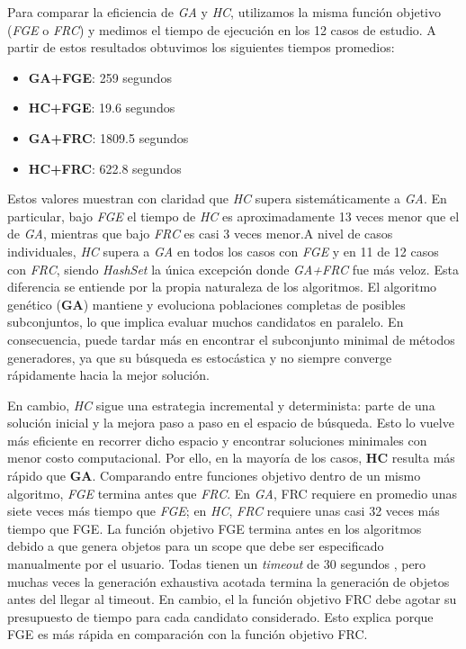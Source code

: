 Para comparar la eficiencia de \emph{GA} y \emph{HC}, utilizamos la misma 
función objetivo (\emph{FGE} o \emph{FRC}) y medimos el tiempo de ejecución 
en los 12 casos de estudio. A partir de estos resultados obtuvimos los siguientes 
tiempos promedios:

\begin{itemize}
  \item \textbf{GA+FGE}: 259 segundos
  \item \textbf{HC+FGE}: 19.6 segundos
  \item \textbf{GA+FRC}: 1809.5 segundos
  \item \textbf{HC+FRC}: 622.8 segundos
\end{itemize}

Estos valores muestran con claridad que \emph{HC} supera sistemáticamente a 
\emph{GA}. En particular, bajo \emph{FGE} el tiempo de \emph{HC} es 
aproximadamente 13 veces menor que el de \emph{GA}, mientras que bajo 
\emph{FRC} es casi 3 veces menor.A nivel de casos
individuales, \emph{HC} supera a \emph{GA} en todos los casos con \emph{FGE} y en 11 de 12 casos con \emph{FRC},
siendo \emph{HashSet} la única excepción donde \emph{GA+FRC} fue más veloz. 
Esta diferencia se entiende por la propia naturaleza de los algoritmos.
El algoritmo genético (\textbf{GA}) mantiene y evoluciona poblaciones completas de posibles subconjuntos, lo que implica evaluar muchos candidatos en paralelo.
En consecuencia, puede tardar más en encontrar el subconjunto minimal de métodos generadores, ya que su búsqueda es estocástica y no siempre converge rápidamente hacia la mejor solución.

En cambio, \emph{HC} sigue una estrategia incremental y determinista: parte de una solución inicial y la mejora paso a paso en el espacio de búsqueda. Esto lo vuelve más eficiente en recorrer dicho espacio y encontrar soluciones minimales con menor costo computacional. Por ello, en la mayoría de los casos, \textbf{HC} resulta más rápido que \textbf{GA}.
Comparando entre funciones objetivo dentro de un mismo algoritmo, \emph{FGE}
termina antes que \emph{FRC}. En \emph{GA}, FRC requiere en promedio
unas siete veces más tiempo que \emph{FGE}; en \emph{HC}, \emph{FRC} requiere unas casi 32 veces
más tiempo que FGE. La función objetivo FGE termina antes en los algoritmos debido a que genera objetos 
para un scope que debe ser especificado manualmente por el usuario. Todas tienen un \emph{timeout} de 
30 segundos , pero muchas veces
la generación exhaustiva acotada termina la generación de objetos antes del llegar al timeout. En cambio, el la función objetivo FRC debe agotar su presupuesto de tiempo
para cada candidato considerado.
Esto explica porque FGE es más rápida en comparación con la función objetivo FRC.

